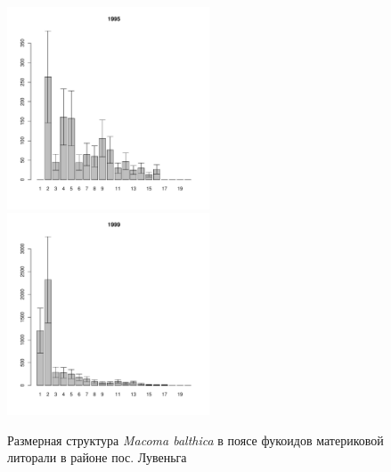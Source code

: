\begin{figure}[h]
\begin{multicols}{3}
\hfill
\includegraphics[width=60mm]{../White_Sea/Luvenga_II_razrez/fucus_zone_1995_.pdf}
\hfill
\includegraphics[width=60mm]{../White_Sea/Luvenga_II_razrez/fucus_zone_1999_.pdf}

\end{multicols}


\caption{Размерная структура {\it Macoma balthica} в поясе фукоидов материковой литорали в районе пос. Лувеньга}
\label{ris:size_str_2razrez_fucus}
\end{figure}

